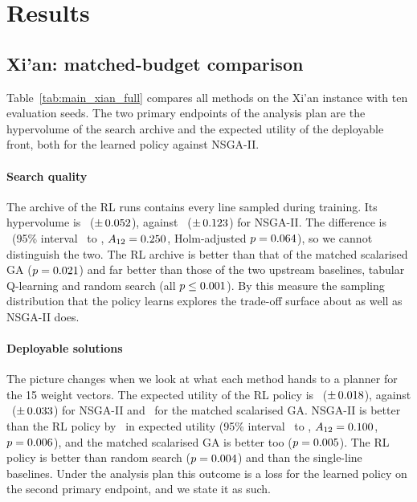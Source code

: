 \section{Results}\label{sec:results}

\subsection{Xi'an: matched-budget comparison}\label{sec:res-xian}
Table~\ref{tab:main_xian_full} compares all methods on the Xi'an instance with ten evaluation seeds. The two primary endpoints of the analysis plan are the hypervolume of the search archive and the expected utility of the deployable front, both for the learned policy against NSGA-II.



\paragraph{Search quality} The archive of the RL runs contains every line sampled during training. Its hypervolume is \XianRLArchHv\ ($\pm\,0.052$), against \XianNSGAArchHv\ ($\pm\,0.123$) for NSGA-II. The difference is \XianRLvsNSGAArchHvDiff\ (95\% interval \XianRLvsNSGAArchHvDiffLo\ to \XianRLvsNSGAArchHvDiffHi, $A_{12}=0.250$, Holm-adjusted $p=0.064$), so we cannot distinguish the two. The RL archive is better than that of the matched scalarised GA ($p=0.021$) and far better than those of the two upstream baselines, tabular Q-learning and random search (all $p\le0.001$). By this measure the sampling distribution that the policy learns explores the trade-off surface about as well as NSGA-II does.

\paragraph{Deployable solutions} The picture changes when we look at what each method hands to a planner for the 15 weight vectors. The expected utility of the RL policy is \XianRLEum\ ($\pm\,0.018$), against \XianNSGAEum\ ($\pm\,0.033$) for NSGA-II and \XianGAMatchedEum\ for the matched scalarised GA. NSGA-II is better than the RL policy by \XianRLvsNSGAPolicyEumDiff\ in expected utility (95\% interval \XianRLvsNSGAPolicyEumDiffLo\ to \XianRLvsNSGAPolicyEumDiffHi, $A_{12}=0.100$, $p=0.006$), and the matched scalarised GA is better too ($p=0.005$). The RL policy is better than random search ($p=0.004$) and than the single-line baselines. Under the analysis plan this outcome is a loss for the learned policy on the second primary endpoint, and we state it as such.

